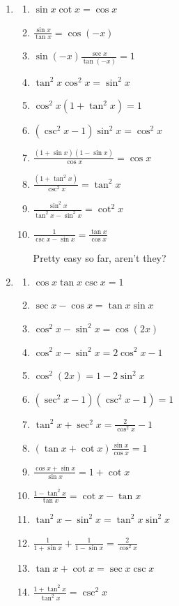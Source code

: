 \documentclass[english]{book}
\begin{document}
\renewcommand\theenumi{\Roman{enumi}}
\renewcommand\theenumii{\arabic{enumii}}

\begin{enumerate}

  \item \begin{enumerate}  %
    \item $\sin x \cot x = \cos x $
    \item $\frac{\sin x}{\tan x} = \cos(-x) $
    \item $\sin(-x) \frac{\sec x}{\tan(-x) } = 1$
    \item $\tan^{2} x \cos^{2} x = \sin^{2} x $
    \item $\cos^{2} x  (1 + \tan^{2} x) = 1$
    \item $(\csc^{2} x - 1) \sin^{2} x = \cos^{2} x $
    \item $\frac{(1 + \sin x) (1 - \sin x)}{\cos x} = \cos x $
    \item $\frac{(1 + \tan^{2} x)}{\csc^{2} x} = \tan^{2} x $
    \item $\frac{\sin^{2} x}{\tan^{2} x - \sin^{2} x} = \cot^{2} x $
    \item $\frac{1}{\csc x - \sin x} = \frac{\tan x}{\cos x}$

          \vspace{0.3cm}

          Pretty easy so far, aren't they?
  \end{enumerate}

  \item \begin{enumerate}  %
    \item $\cos x \tan x \csc x = 1$
    \item $\sec x - \cos x = \tan x \sin x $
    \item $\cos^{2} x - \sin^{2} x = \cos(2x) $
    \item $\cos^{2} x - \sin^{2} x = 2 \cos^{2} x - 1$
    \item $\cos^{2}(2x) = 1 - 2 \sin^{2} x $
    \item $(\sec^{2} x - 1) (\csc^{2} x - 1) = 1$
    \item $\tan^{2} x + \sec^{2} x = \frac{2}{\cos^{2} x} - 1$
    \item $(\tan x + \cot x) \frac{\sin x}{\cos x} = 1$
    \item $\frac{\cos x + \sin x}{\sin x} = 1 + \cot x $
    \item $\frac{1 - \tan^{2} x}{\tan x} = \cot x - \tan x$
    \item $\tan^{2} x - \sin^{2} x = \tan^{2} x \sin^{2} x$
    \item $\frac{1}{1 + \sin x} + \frac{1}{1 - \sin x} = \frac{2}{\cos^{2} x}$
    \item $\tan x + \cot x = \sec x \csc x$
    \item $\frac{1 + \tan^{2} x}{\tan^{2} x} = \csc^{2} x$
  \end{enumerate}


\end{enumerate}
\end{document}
